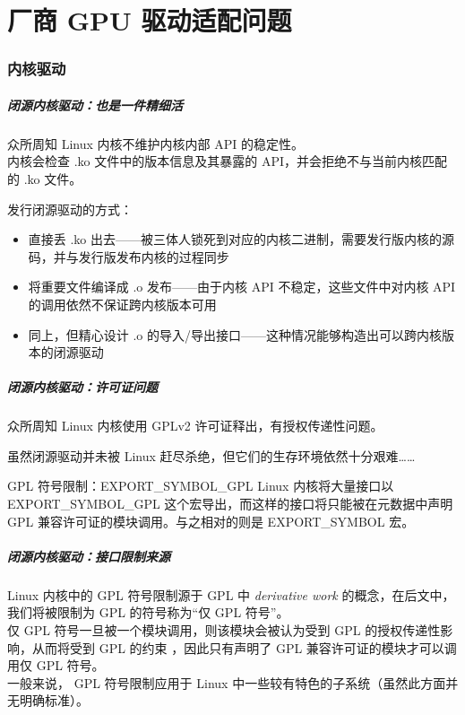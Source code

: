 \documentclass{ctexbeamer}
\begin{document}
\part{厂商 GPU 驱动适配问题}
\frame{\partpage}

\section{内核驱动}

\begin{frame}
    \frametitle{闭源内核驱动：也是一件精细活}
    \begin{block}{众所周知}
        Linux 内核不维护内核内部 API 的稳定性。\\
        内核会检查 .ko 文件中的版本信息及其暴露的 API，并会拒绝不与当前内核匹配的 .ko 文件。
    \end{block}
    发行闭源驱动的方式：
    \begin{itemize}
        \item 直接丢 .ko 出去——被三体人锁死到对应的内核二进制，需要发行版内核的源码，并与发行版发布内核的过程同步
        \item 将重要文件编译成 .o 发布——由于内核 API 不稳定，这些文件中对内核 API 的调用依然不保证跨内核版本可用
        \item 同上，但精心设计 .o 的导入/导出接口——这种情况能够构造出可以跨内核版本的闭源驱动
    \end{itemize}
\end{frame}

\begin{frame}
    \frametitle{闭源内核驱动：许可证问题}
    \begin{block}{众所周知}
        Linux 内核使用 GPLv2 许可证释出，有授权传递性问题。
    \end{block}
    虽然闭源驱动并未被 Linux 赶尽杀绝，但它们的生存环境依然十分艰难……\\
    \begin{block}{GPL 符号限制：EXPORT\_SYMBOL\_GPL}
        Linux 内核将大量接口以 EXPORT\_SYMBOL\_GPL 这个宏导出，而这样的接口将只能被在元数据中声明 GPL 兼容许可证的模块调用。与之相对的则是 EXPORT\_SYMBOL 宏。
    \end{block}
\end{frame}

\begin{frame}
    \frametitle{闭源内核驱动：接口限制来源}
    Linux 内核中的 GPL 符号限制源于 GPL 中 \textit{derivative work} 的概念，在后文中，我们将被限制为 GPL 的符号称为“仅 GPL 符号”。\\
    仅 GPL 符号一旦被一个模块调用，则该模块会被认为受到 GPL 的授权传递性影响，从而将受到 GPL 的约束 ，因此只有声明了 GPL 兼容许可证的模块才可以调用仅 GPL 符号。\\
    一般来说， GPL 符号限制应用于 Linux 中一些较有特色的子系统（虽然此方面并无明确标准）。
\end{frame}
\end{document}
